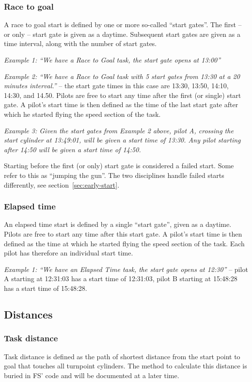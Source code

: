 \documentclass{article}
\begin{document}
\subsubsection{Race to goal}
A race to goal start is defined by one or more so-called “start gates”. The
first – or only – start gate is given as a daytime. Subsequent start gates are
given as a time interval, along with the number of start gates.

\textit{Example 1: “We have a Race to Goal task, the start gate opens at 13:00”}

\textit{Example 2: “We have a Race to Goal task with 5 start gates from 13:30 at a 20
minutes interval.”} – the start gate times in this case are 13:30, 13:50, 14:10,
14:30, and 14.50.  Pilots are free to start any time after the first (or
single) start gate. A pilot’s start time is then defined as the time of the
last start gate after which he started flying the speed section of the task.

\textit{Example 3: Given the start gates from Example 2 above, pilot A, crossing the
start cylinder at 13:49:01, will be given a start time of 13:30. Any pilot
starting after 14:50 will be given a start time of 14:50.}

Starting before the first (or only) start gate is considered a failed start.
Some refer to this as “jumping the gun”. The two disciplines handle failed
starts differently, see section~\ref{sec:early-start}.

\subsubsection{Elapsed time}
An elapsed time start is defined by a single “start gate”, given as a daytime.
Pilots are free to start any time after this start gate. A pilot’s start time
is then defined as the time at which he started flying the speed section of the
task. Each pilot has therefore an individual start time.

\textit{Example 1: “We have an Elapsed Time task, the start gate opens at 12:30”}
– pilot A starting at 12:31:03 has a start time of 12:31:03, pilot B starting
at 15:48:28 has a start time of 15:48:28.

\subsection{Distances}
\subsubsection{Task distance}
\label{sec:task-distance}
Task distance is defined as the path of shortest distance from the start point
to goal that touches all turnpoint cylinders. The method to calculate this
distance is buried in FS’ code and will be documented at a later time.
\end{document}

